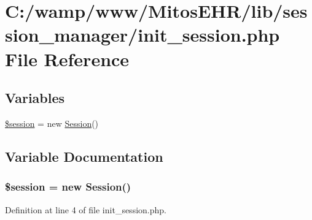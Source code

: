 \hypertarget{init__session_8php}{\section{\-C\-:/wamp/www/\-Mitos\-E\-H\-R/lib/session\-\_\-manager/init\-\_\-session.php \-File \-Reference}
\label{init__session_8php}
}
\subsection*{\-Variables}
\begin{DoxyCompactItemize}
\item 
\hyperlink{init__session_8php_abefb3c26429d514777313e9a63d7cbac}{\$session} = new \hyperlink{class_session}{\-Session}()
\end{DoxyCompactItemize}


\subsection{\-Variable \-Documentation}
\hypertarget{init__session_8php_abefb3c26429d514777313e9a63d7cbac}{
\subsubsection[{\$session}]{\setlength{\rightskip}{0pt plus 5cm}\$session = new {\bf \-Session}()}}\label{init__session_8php_abefb3c26429d514777313e9a63d7cbac}


\-Definition at line 4 of file init\-\_\-session.\-php.

